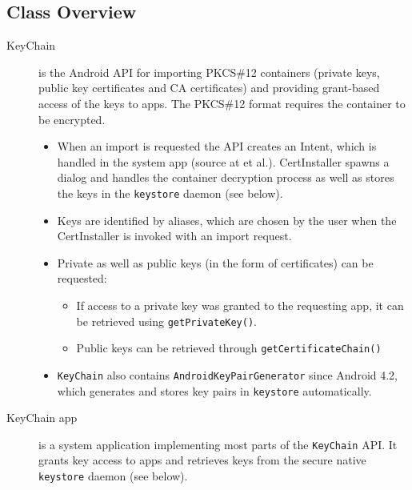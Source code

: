\documentclass[a4paper,draft]{scrartcl}
\begin{document}
	\subsection{Class Overview}
		\begin{description}
			\item[KeyChain] is the Android API for importing PKCS\#12 containers (private keys, public key certificates and CA certificates) and providing grant-based access of the keys to apps. The PKCS\#12 format requires the container to be encrypted.
				\begin{itemize}
					\item When an import is requested the API creates an Intent, which is handled in the system app  (source at  et al.). CertInstaller spawns a dialog and handles the container decryption process as well as stores the keys in the \texttt{keystore} daemon (see below).
					\item Keys are identified by aliases, which are chosen by the user when the CertInstaller is invoked with an import request.
					\item Private as well as public keys (in the form of certificates) can be requested:
					\begin{itemize}
						\item If access to a private key was granted to the requesting app, it can be retrieved using \texttt{getPrivateKey()}.
						\item Public keys can be retrieved through \texttt{getCertificateChain()}
					\end{itemize}
				\item \texttt{KeyChain} also contains \texttt{AndroidKeyPairGenerator} since Android 4.2, which generates and stores key pairs in \texttt{key\-store} automatically.
				\end{itemize}

			\item[KeyChain app] is a system application implementing most parts of the \texttt{KeyChain} API. It grants key access to apps and retrieves keys from the secure native \texttt{keystore} daemon (see below).


\end{description}
\end{document}
